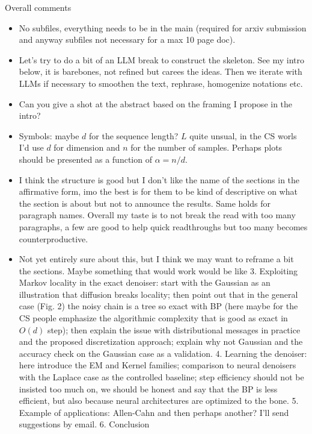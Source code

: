 \documentclass{article}
\newcommand{\jgb}[1]{{\color{jgbcolor}#1}}
\begin{document}
\jgb{Overall comments
\begin{itemize}
    \item No subfiles, everything needs to be in the main (required for arxiv submission and anyway subfiles not necessary for a max 10 page doc). 
    \item Let's try to do a bit of an LLM break to construct the skeleton. See my intro below, it is barebones, not refined but carees the ideas. Then we iterate with LLMs if necessary to smoothen the text, rephrase, homogenize notations etc. 
    \item Can you give a shot at the abstract based on the framing I propose in the intro? 
    \item Symbols: maybe $d$ for the sequence length? $L$ quite unsual, in the CS worls I'd use $d$ for dimension and $n$ for the number of samples. Perhaps plots should be presented as a function of $\alpha = n/d$.
    \item I think the structure is good but I don't like the name of the sections in the affirmative form, imo the best is for them to be kind of descriptive on what the section is about but not to announce the results. Same holds for paragraph names. Overall my taste is to not break the read with too many paragraphs, a few are good to help quick readthroughs but too many becomes counterproductive.
    \item Not yet entirely sure about this, but I think we may want to reframe a bit the sections. Maybe something that would work would be like 3. Exploiting Markov locality in the exact denoiser: start with the Gaussian as an illustration that diffusion breaks locality; then point out that in the general case (Fig. 2) the noisy chain is a tree so exact with BP (here maybe for the CS people emphasize the algorithmic complexity that is good as exact in $O(d)$ step); then explain the issue with distributional messages in practice and the proposed discretization approach; explain why not Gaussian and the accuracy check on the Gaussian case as a validation. 4. Learning the denoiser: here introduce the EM and Kernel families; comparison to neural denoisers with the Laplace case as the controlled baseline; step efficiency should not be insisted too much on, we should be honest and say that the BP is less efficient, but also because neural architectures are optimized to the bone. 5. Example of applications: Allen-Cahn and then perhaps another? I'll send suggestions by email. 6. Conclusion
    
\end{itemize}
}
\end{document}
